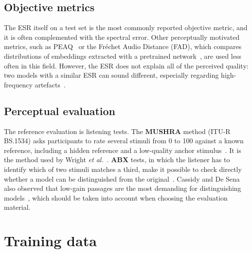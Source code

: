 \documentclass[ENG]{TFUOC}%
\begin{document}
\subsection{Objective metrics}

The ESR itself on a test set is the most commonly reported objective metric, and it is often complemented with the spectral error. Other perceptually motivated metrics, such as PEAQ~\cite{itu2001} or the Fréchet Audio Distance (FAD), which compares distributions of embeddings extracted with a pretrained network~\cite{kilgour2019}, are used less often in this field. However, the ESR does not explain all of the perceived quality: two models with a similar ESR can sound different, especially regarding high-frequency artefacts~\cite{wright2020percep}.

\subsection{Perceptual evaluation}

The reference evaluation is listening tests. The \textbf{MUSHRA} method (ITU-R BS.1534) asks participants to rate several stimuli from 0 to 100 against a known reference, including a hidden reference and a low-quality anchor stimulus~\cite{itu2015}. It is the method used by Wright \emph{et al.}~\cite{wright2020}. \textbf{ABX} tests, in which the listener has to identify which of two stimuli matches a third, make it possible to check directly whether a model can be distinguished from the original~\cite{cassidy2023}. Cassidy and De Sena also observed that low-gain passages are the most demanding for distinguishing models~\cite{cassidy2023}, which should be taken into account when choosing the evaluation material.

\section{Training data}
\label{s:dades}
\end{document}
